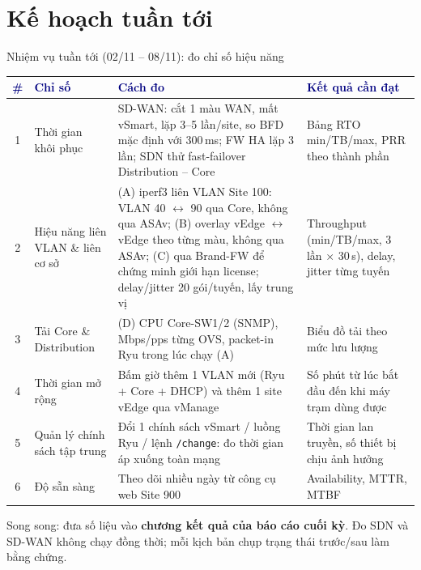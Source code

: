 \documentclass[aspectratio=169, 10pt, xcolor={table}]{beamer}
\renewcommand{\arraystretch}{1.25}
\newcommand{\hd}[1]{\textcolor{navy}{\textbf{#1}}}
\begin{document}
\section{Kế hoạch tuần tới}

\begin{frame}{Nhiệm vụ tuần tới (02/11 -- 08/11): đo chỉ số hiệu năng}
    \vspace{0.05cm}
    \scriptsize
    \renewcommand{\arraystretch}{1.4}
    \begin{tabularx}{\textwidth}{@{}cL{0.19\textwidth}YL{0.24\textwidth}@{}}
        \toprule
        \hd{\#} & \hd{Chỉ số} & \hd{Cách đo} & \hd{Kết quả cần đạt} \\
         & Thời gian khôi phục & SD-WAN: cắt 1 màu WAN, mất vSmart, lặp 3--5 lần/site, so BFD mặc định với 300\,ms; FW HA lặp 3 lần; SDN thử fast-failover Distribution -- Core & Bảng RTO min/TB/max, PRR theo thành phần \\
        2 & Hiệu năng liên VLAN \& liên cơ sở & (A) iperf3 liên VLAN Site 100: VLAN 40 $\leftrightarrow$ 90 qua Core, không qua ASAv; (B) overlay vEdge $\leftrightarrow$ vEdge theo từng màu, không qua ASAv; (C) qua Brand-FW để chứng minh giới hạn license; delay/jitter 20 gói/tuyến, lấy trung vị & Throughput (min/TB/max, 3 lần $\times$ 30\,s), delay, jitter từng tuyến \\
        3 & Tải Core \& Distribution & (D) CPU Core-SW1/2 (SNMP), Mbps/pps từng OVS, packet-in Ryu trong lúc chạy (A) & Biểu đồ tải theo mức lưu lượng \\
        4 & Thời gian mở rộng & Bấm giờ thêm 1 VLAN mới (Ryu + Core + DHCP) và thêm 1 site vEdge qua vManage & Số phút từ lúc bắt đầu đến khi máy trạm dùng được \\
        5 & Quản lý chính sách tập trung & Đổi 1 chính sách vSmart / luồng Ryu / lệnh \texttt{/change}: đo thời gian áp xuống toàn mạng & Thời gian lan truyền, số thiết bị chịu ảnh hưởng \\
        6 & Độ sẵn sàng & Theo dõi nhiều ngày từ công cụ web Site 900 & Availability, MTTR, MTBF \\
        \bottomrule
    \end{tabularx}
    \vspace{0.08cm}

    {\scriptsize\color{inkSoft}Song song: đưa số liệu vào \textbf{chương kết quả của báo cáo cuối kỳ}.
    Đo SDN và SD-WAN không chạy đồng thời; mỗi kịch bản chụp trạng thái trước/sau làm bằng chứng.\par}
\end{frame}
\end{document}
